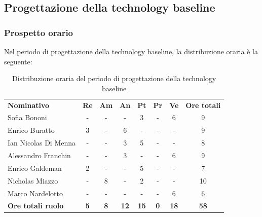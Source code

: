 \documentclass[../piano-di-progetto.tex]{subfiles}
\begin{document}
  \subsection{Progettazione della technology baseline}

  \subsubsection{Prospetto orario}
  Nel periodo di progettazione della technology baseline, la distribuzione oraria è la seguente:
  \begin{table}[H]
    \centering
    \begin{tabular}{lccccccc}
    \rowcolor{lightgray}
        \textbf{Nominativo}       & \textbf{Re} & \textbf{Am} & \textbf{An} & \textbf{Pt} & \textbf{Pr} & \textbf{Ve} & \textbf{Ore totali} \\
Sofia Bononi              & -           & -           & -           & 3           & -           & 6           & 9                   \\
Enrico Buratto            & 3           & -           & 6           & -           & -           & -           & 9                   \\
Ian Nicolas Di Menna      & -           & -           & 3           & 5           & -           & -           & 8                   \\
Alessandro Franchin       & -           & -           & 3           & -           & -           & 6           & 9                   \\
Enrico Galdeman           & 2           & -           & -           & 5           & -           & -           & 7                   \\
Nicholas Miazzo           & -           & 8           & -           & 2           & -           & -           & 10                  \\
Marco Nardelotto          & -           & -           & -           & -           & -           & 6           & 6                   \\
\textbf{Ore totali ruolo} & \textbf{5}  & \textbf{8}  & \textbf{12} & \textbf{15} & \textbf{0}  & \textbf{18} & \textbf{58} 
    \end{tabular}
    \caption{Distribuzione oraria del periodo di progettazione della technology baseline}
  \end{table}
\end{document}
